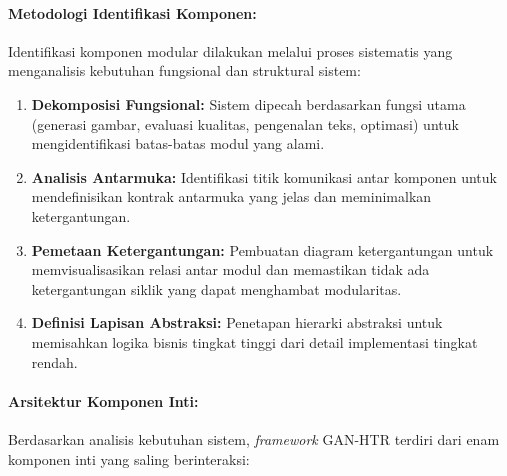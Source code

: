 \documentclass[12pt,a4paper]{article}
\begin{document}
\paragraph{Metodologi Identifikasi Komponen:}
Identifikasi komponen modular dilakukan melalui proses sistematis yang menganalisis kebutuhan fungsional dan struktural sistem:

\begin{enumerate}[label=\arabic*., leftmargin=*, nosep]
\item \textbf{Dekomposisi Fungsional:} Sistem dipecah berdasarkan fungsi utama (generasi gambar, evaluasi kualitas, pengenalan teks, optimasi) untuk mengidentifikasi batas-batas modul yang alami.

\item \textbf{Analisis Antarmuka:} Identifikasi titik komunikasi antar komponen untuk mendefinisikan kontrak antarmuka yang jelas dan meminimalkan ketergantungan.

\item \textbf{Pemetaan Ketergantungan:} Pembuatan diagram ketergantungan untuk memvisualisasikan relasi antar modul dan memastikan tidak ada ketergantungan siklik yang dapat menghambat modularitas.

\item \textbf{Definisi Lapisan Abstraksi:} Penetapan hierarki abstraksi untuk memisahkan logika bisnis tingkat tinggi dari detail implementasi tingkat rendah.
\end{enumerate}

\paragraph{Arsitektur Komponen Inti:}
Berdasarkan analisis kebutuhan sistem, \textit{framework} GAN-HTR terdiri dari enam komponen inti yang saling berinteraksi:
\end{document}
